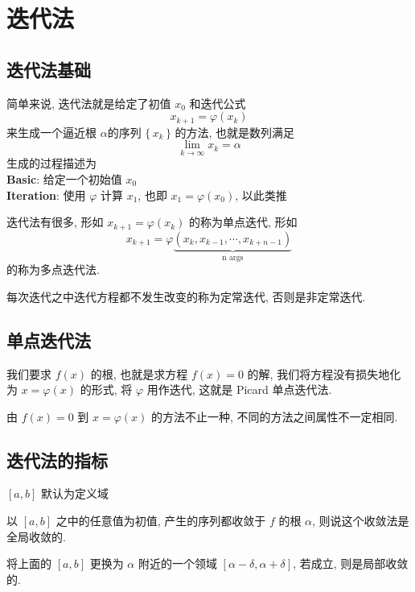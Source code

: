 \section{迭代法}
\subsection{迭代法基础}

\begin{frame}
		简单来说, 迭代法就是给定了初值 \(x_{0}\) 和迭代公式
		\[
				x_{k+1} = \varphi (x _{k})
		\]
		来生成一个逼近根 \(\alpha\)的序列 \(\{ \, x_{k} \, \}\) 的方法, 也就是数列满足
		\[
				\lim _{k \to \infty} x_{k} =\alpha
		\]
		生成的过程描述为\\
		\textbf{Basic}: 给定一个初始值 \(x_{0}\)\\
		\textbf{Iteration}: 使用 \( \varphi\) 计算 \(x_1\), 也即 \(x_1 = \varphi(x_0)\), 以此类推
\end{frame}
\begin{frame}
		迭代法有很多, 形如 \(x_{k+1} = \varphi (x_{k})\) 的称为单点迭代, 形如
		\[
				x_{k+1} = \varphi\underbrace{(x _{k}, x_{k-1}, \cdots , x_{k + n -1})}_{\text{n args}}
		\]
		的称为多点迭代法.

		\smallskip
		每次迭代之中迭代方程都不发生改变的称为定常迭代, 否则是非定常迭代.
\end{frame}

\subsection{单点迭代法}
\begin{frame}
我们要求 \(f (x)\) 的根, 也就是求方程 \(f (x) = 0\) 的解, 我们将方程没有损失地化为 \( x = \varphi (x)\) 的形式, 将 \( \varphi\) 用作迭代, 这就是 Picard 单点迭代法.

\smallskip
		由 \(f (x) = 0\) 到 \(x = \varphi (x)\) 的方法不止一种, 不同的方法之间属性不一定相同.
\end{frame}

\subsection{迭代法的指标}
\begin{frame}
		\([a, b]\) 默认为定义域
\begin{defi}[全局收敛]
		以 \([ a, b]\) 之中的任意值为初值, 产生的序列都收敛于 \(f\) 的根 \(\alpha\), 则说这个收敛法是全局收敛的.
\end{defi}
\begin{defi}[局部收敛]
		将上面的 \([a, b]\) 更换为 \(\alpha\) 附近的一个领域 \([\alpha -\delta ,\alpha +\delta]\), 若成立, 则是局部收敛的.
\end{defi}
\end{frame}

